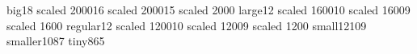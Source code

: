 \nobeamer@buildfamily%
    {big}{18 scaled 2000}{16 scaled 2000}{15 scaled 2000}
\nobeamer@buildfamily%
    {large}{12 scaled 1600}{10 scaled 1600}{9 scaled 1600}
\nobeamer@buildfamily%
    {regular}{12 scaled 1200}{10 scaled 1200}{9 scaled 1200}
\nobeamer@buildfamily%
    {small}{12}{10}{9}
\nobeamer@buildfamily%
    {smaller}{10}{8}{7}
\nobeamer@buildfamily%
    {tiny}{8}{6}{5}
\makeatother

\regular %

\def\newslide{\vfill\break}
\def\topfill{\topglue 0pt plus 1fill}
\def\foldbottom{\vskip 0pt plus -1fill}
